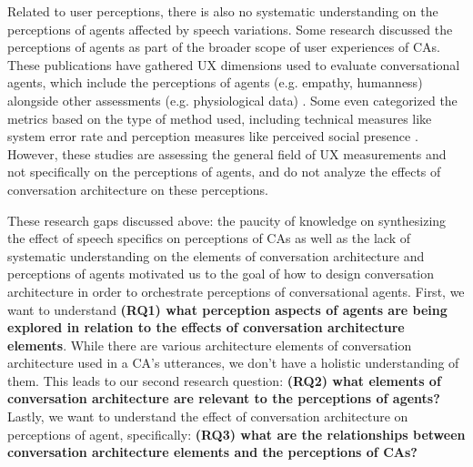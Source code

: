 Related to user perceptions, there is also no systematic understanding on the perceptions of agents affected by speech variations. Some research discussed the perceptions of agents as part of the broader scope of user experiences of CAs. These publications have gathered UX dimensions used to evaluate conversational agents, which include the perceptions of agents (e.g. empathy, humanness) alongside other assessments (e.g. physiological data) \cite{clark2019state, finch2020towards}. Some even categorized the metrics based on the type of method used, including technical measures like system error rate and perception measures like perceived social presence \cite{zheng2022ux}. However, these studies are assessing the general field of UX measurements and not specifically on the perceptions of agents, and do not analyze the effects of conversation architecture on these perceptions.

These research gaps discussed above: the paucity of knowledge on synthesizing the effect of speech specifics on perceptions of CAs as well as the lack of systematic understanding on the elements of conversation architecture and perceptions of agents motivated us to the goal of how to design conversation architecture in order to orchestrate perceptions of conversational agents. First, we want to understand \textbf{(RQ1) what perception aspects of agents are being explored in relation to the effects of conversation architecture elements}. While there are various architecture elements of conversation architecture used in a CA's utterances, we don't have a holistic understanding of them. This leads to our second research question: \textbf{(RQ2) what elements of conversation architecture are relevant to the perceptions of agents?} Lastly, we want to understand the effect of conversation architecture on perceptions of agent, specifically: \textbf{(RQ3) what are the relationships between conversation architecture elements and the perceptions of CAs?}

